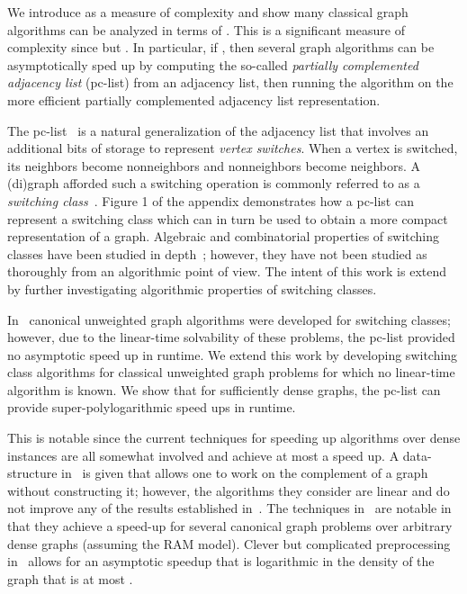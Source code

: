 \documentclass{llncs}
\begin{document}
We introduce  as a measure of complexity and show many classical graph algorithms can be analyzed in terms of .  This is a significant measure of complexity since  but .  In particular, if , then several graph algorithms can be asymptotically sped up by computing the so-called \emph{partially complemented adjacency list}  (pc-list) from an adjacency list, then running the algorithm on the more efficient partially complemented adjacency list representation.  

The pc-list~\cite{DahlhausGM02} is a natural generalization of the adjacency list  that involves an additional  bits of storage to represent \emph{vertex switches}.  When a vertex is switched, its neighbors become nonneighbors and nonneighbors become neighbors.   A (di)graph afforded such a switching operation is commonly referred to as a \emph{switching class}~\cite{Seidel76}.  Figure 1 of the appendix demonstrates how a pc-list can represent a switching class which can in turn be used to obtain a more compact representation of a graph.  Algebraic and combinatorial properties of switching classes have been studied in depth~\cite{Seidel76,ChengW86}; however, they have not been studied as thoroughly from an algorithmic point of view.  The intent of this work is extend~\cite{DahlhausGM02} by further investigating algorithmic properties of switching classes.

In~\cite{DahlhausGM02} canonical  unweighted graph algorithms were developed for switching classes; however, due to the linear-time solvability of these problems, the pc-list provided no asymptotic speed up in runtime.  We extend this work by developing switching class algorithms for classical unweighted graph problems for which no linear-time algorithm is known.  We show that for sufficiently dense graphs, the pc-list can provide super-polylogarithmic speed ups in runtime. 

This is notable since the current techniques for speeding up algorithms over dense instances are all somewhat involved and achieve at most a  speed up.  A data-structure in~\cite{KaoOT98} is given that allows one to work on the complement of a graph without constructing it; however, the algorithms they consider are linear and do not improve any of the results established in~\cite{DahlhausGM02}.
The techniques in~\cite{CheriyanM96} are notable in that they achieve a  speed-up for several canonical graph problems over arbitrary dense graphs (assuming the RAM model).  Clever but complicated preprocessing in~\cite{FederM95} allows for an asymptotic speedup that is logarithmic in the density of the graph that is at most .  
\end{document}
